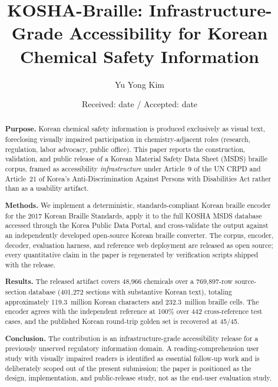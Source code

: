 \documentclass[smallextended]{svjour3}
\begin{document}
\title{KOSHA-Braille: Infrastructure-Grade Accessibility for Korean Chemical Safety Information}


\author{Yu Yong Kim}



\date{Received: date / Accepted: date}

\maketitle

\begin{abstract}
\textbf{Purpose.} Korean chemical safety information is produced exclusively as visual text, foreclosing visually impaired participation in chemistry-adjacent roles (research, regulation, labor advocacy, public office). This paper reports the construction, validation, and public release of a Korean Material Safety Data Sheet (MSDS) braille corpus, framed as accessibility \emph{infrastructure} under Article~9 of the UN CRPD and Article~21 of Korea's Anti-Discrimination Against Persons with Disabilities Act rather than as a usability artifact.

\textbf{Methods.} We implement a deterministic, standards-compliant Korean braille encoder for the 2017 Korean Braille Standards, apply it to the full KOSHA MSDS database accessed through the Korea Public Data Portal, and cross-validate the output against an independently developed open-source Korean braille converter. The corpus, encoder, decoder, evaluation harness, and reference web deployment are released as open source; every quantitative claim in the paper is regenerated by verification scripts shipped with the release.

\textbf{Results.} The released artifact covers 48{,}966 chemicals over a 769{,}897-row source-section database (401{,}272 sections with substantive Korean text), totaling approximately 119.3~million Korean characters and 232.3~million braille cells. The encoder agrees with the independent reference at 100\% over 442 cross-reference test cases, and the published Korean round-trip golden set is recovered at 45/45.

\textbf{Conclusion.} The contribution is an infrastructure-grade accessibility release for a previously unserved regulatory information domain. A reading-comprehension user study with visually impaired readers is identified as essential follow-up work and is deliberately scoped out of the present submission; the paper is positioned as the design, implementation, and public-release study, not as the end-user evaluation study.
\end{abstract}
\end{document}
